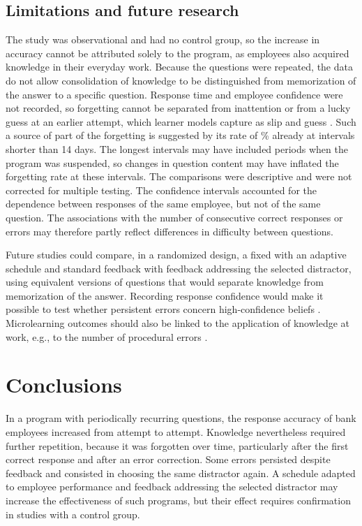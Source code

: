 \subsection{Limitations and future research}
The study was observational and had no control group, so the increase in accuracy cannot be attributed
solely to the program, as employees also acquired knowledge in their everyday work. Because the
questions were repeated, the data do not allow consolidation of knowledge to be distinguished from
memorization of the answer to a specific question. Response time and employee confidence were not
recorded, so forgetting cannot be separated from inattention or from a lucky guess at an earlier
attempt, which learner models capture as slip and guess \citep{corbett1994}. Such a source of part of
the forgetting is suggested by its rate of \ForgetShort\% already at intervals shorter than 14 days.
The longest intervals may have included periods when the program was suspended, so changes in question
content may have inflated the forgetting rate at these intervals. The comparisons were descriptive and
were not corrected for multiple testing. The confidence intervals accounted for the dependence between
responses of the same employee, but not of the same question. The associations with the number of
consecutive correct responses or errors may therefore partly reflect differences in difficulty between
questions.

Future studies could compare, in a randomized design, a fixed with an adaptive schedule and standard
feedback with feedback addressing the selected distractor, using equivalent versions of questions that
would separate knowledge from memorization of the answer. Recording response confidence would make it
possible to test whether persistent errors concern high-confidence beliefs \citep{butler2011}.
Microlearning outcomes should also be linked to the application of knowledge at work, e.g., to the
number of procedural errors \citep{blume2010}.

\section{Conclusions}
In a program with periodically recurring questions, the response accuracy of bank employees increased
from attempt to attempt. Knowledge nevertheless required further repetition, because it was forgotten
over time, particularly after the first correct response and after an error correction. Some errors
persisted despite feedback and consisted in choosing the same distractor again. A schedule adapted to
employee performance and feedback addressing the selected distractor may increase the effectiveness of
such programs, but their effect requires confirmation in studies with a control group.
